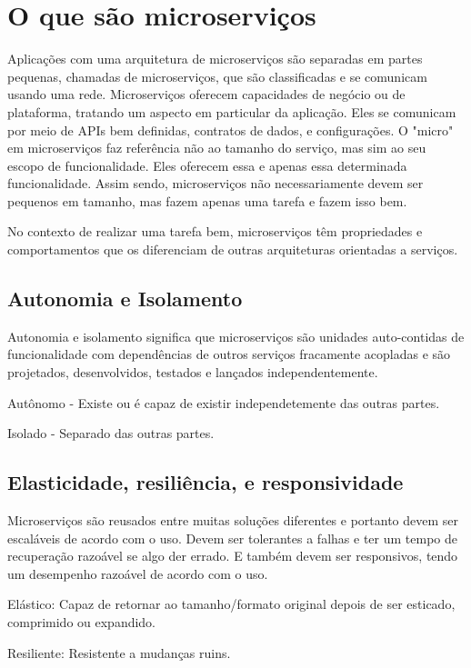 \section{O que são microserviços}

Aplicações com uma arquitetura de microserviços são separadas em partes pequenas, chamadas de microserviços, que são classificadas e se comunicam usando uma rede. Microserviços oferecem capacidades de negócio ou de plataforma, tratando um aspecto em particular da aplicação. Eles se comunicam por meio de APIs bem definidas, contratos de dados, e configurações. O "micro" em microserviços faz referência não ao tamanho do serviço, mas sim ao seu escopo de funcionalidade. Eles oferecem essa e apenas essa determinada funcionalidade. Assim sendo, microserviços não necessariamente devem ser pequenos em tamanho, mas fazem apenas uma tarefa e fazem isso bem. 
 
No contexto de realizar uma tarefa bem, microserviços têm propriedades e comportamentos que os diferenciam de outras arquiteturas orientadas a serviços.

\subsection{Autonomia e Isolamento}
Autonomia e isolamento significa que microserviços são unidades auto-contidas de funcionalidade com dependências de outros serviços fracamente acopladas e são projetados, desenvolvidos, testados e lançados independentemente.

Autônomo - Existe ou é capaz de existir independetemente das outras partes.

Isolado - Separado das outras partes. 

\subsection{Elasticidade, resiliência, e responsividade}

Microserviços são reusados entre muitas soluções diferentes e portanto devem ser escaláveis de acordo com o uso. Devem ser tolerantes a falhas e ter um tempo de recuperação razoável se algo der errado. E também devem ser responsivos, tendo um desempenho razoável de acordo com o uso.

Elástico: Capaz de retornar ao tamanho/formato original depois de ser esticado, comprimido ou expandido.

Resiliente: Resistente a mudanças ruins.

